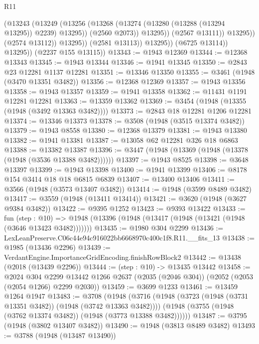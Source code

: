 \begin{lexlean}{R11}
\begin{coremodule}
                              (@13243
                                (@13249
                                  (@13256
                                    (@13268 (@13274 (@13280 (@13288 (@13294 @13295)) @2239) @13295))
                                    (@2560 @2073))
                                  @13295))
                              (@2567 @13111))
                            @13295))
                        (@2574 @13112))
                      @13295))
                  (@2581 @13113))
                @13295))
            (@6725 @13114))
          @13295))
      (@2237 @155 @13115))
@13343 := @1943 @12369
@13344 := @12368 @13343
@13345 := @1943 @13344
@13346 := @1941 @13345
@13350 := @2843 @23 @12281 @1137 @12281
@13351 := @13346 @13350
@13355 := @3461 (@1948 (@3470 @13351 @3482))
@13356 := @12368 @12369
@13357 := @1943 @13356
@13358 := @1943 @13357
@13359 := @1941 @13358
@13362 := @11431 @1191 @12281 @12281
@13363 := @13359 @13362
@13369 := @3454 (@1948 (@13355 (@1948 (@3492 @13363 @3482))))
@13373 := @2843 @18 @12281 @1206 @12281
@13374 := @13346 @13373
@13378 := @3508 (@1948 (@3515 @13374 @3482))
@13379 := @1943 @8558
@13380 := @12368 @13379
@13381 := @1943 @13380
@13382 := @1941 @13381
@13387 := @13058 @62 @12281 @326 @18 @6863
@13388 := @13382 @13387
@13396 := @3447 (@1948 (@13369 (@1948 (@13378 (@1948 (@3536 @13388 @3482))))))
@13397 := @1943 @8525
@13398 := @3648 @13397
@13399 := @1943 @13398
@13400 := @1941 @13399
@13406 := @8178 @154 @3414 @18 @18 @6815 @6839
@13407 := @13400 @13406
@13411 := @3566 (@1948 (@3573 @13407 @3482))
@13414 := @1948 (@3599 @8489 @3482)
@13417 := @3559 (@1948 (@13411 @13414))
@13421 := @3620 (@1948 (@3627 @9384 @3482))
@13422 := @9395 @1252
@13423 := @9393 @13422
@13433 := fun (step : @10) =>
  @1948 (@13396 (@1948 (@13417 (@1948 (@13421 (@1948 (@3646 @13423 @3482)))))))
@13435 := @1980 @304 @2299
@13436 := LexLeanPreserve.C06c44e94c916022bb6668970c400c1f8.R11.__fits_13
@13438 := @1985 (@13436 @2296)
@13439 := VerdantEngine.ImportanceGridEncoding.finishRowBlock2
@13442 := @13438 (@2018 (@13439 @2296))
@13444 := (step : @10) -> @13435 @13442
@13458 := @2024
    @304
    @2299
    @13442
    @1266
    @2637
    (@2035 (@2046 @304))
    (@2052 (@2053 (@2054 @1266) @2299 @2030))
@13459 := @3699 @1233
@13461 := @13459 @1264 @1947
@13483 := @3708
    (@1948
      (@3716
        (@1948 (@3723 (@1948 (@3731 @13351 @3482)) (@1948 (@3742 @13363 @3482))))
        (@1948 (@3755 (@1948 (@3762 @13374 @3482)) (@1948 (@3773 @13388 @3482))))))
@13487 := @3795 (@1948 (@3802 @13407 @3482))
@13490 := @1948 (@3813 @8489 @3482)
@13493 := @3788 (@1948 (@13487 @13490))

\end{coremodule}
\end{lexlean}
